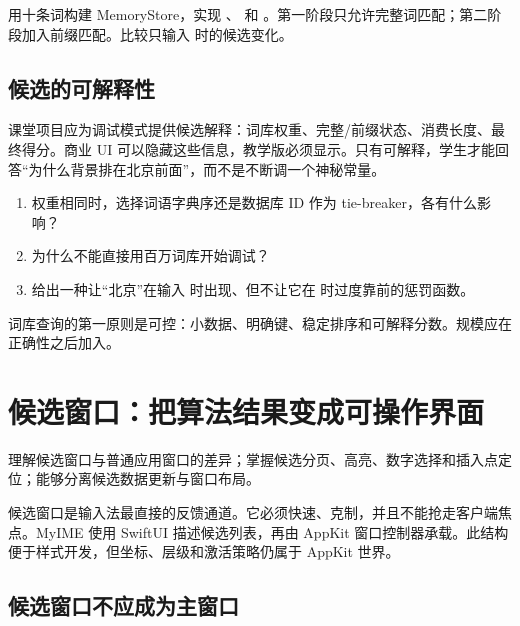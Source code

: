 \begin{lab}[十词输入法]
用十条词构建 MemoryStore，实现 、 和 。第一阶段只允许完整词匹配；第二阶段加入前缀匹配。比较只输入  时的候选变化。
\end{lab}

\section{候选的可解释性}

课堂项目应为调试模式提供候选解释：词库权重、完整/前缀状态、消费长度、最终得分。商业 UI 可以隐藏这些信息，教学版必须显示。只有可解释，学生才能回答“为什么背景排在北京前面”，而不是不断调一个神秘常量。

\exercises
\begin{enumerate}
  \item 权重相同时，选择词语字典序还是数据库 ID 作为 tie-breaker，各有什么影响？
  \item 为什么不能直接用百万词库开始调试？
  \item 给出一种让“北京”在输入  时出现、但不让它在  时过度靠前的惩罚函数。
\end{enumerate}

\begin{summarybox}
词库查询的第一原则是可控：小数据、明确键、稳定排序和可解释分数。规模应在正确性之后加入。
\end{summarybox}


\chapter{候选窗口：把算法结果变成可操作界面}

\begin{goals}
理解候选窗口与普通应用窗口的差异；掌握候选分页、高亮、数字选择和插入点定位；能够分离候选数据更新与窗口布局。
\end{goals}

候选窗口是输入法最直接的反馈通道。它必须快速、克制，并且不能抢走客户端焦点。MyIME 使用 SwiftUI 描述候选列表，再由 AppKit 窗口控制器承载。此结构便于样式开发，但坐标、层级和激活策略仍属于 AppKit 世界。



\section{候选窗口不应成为主窗口}

